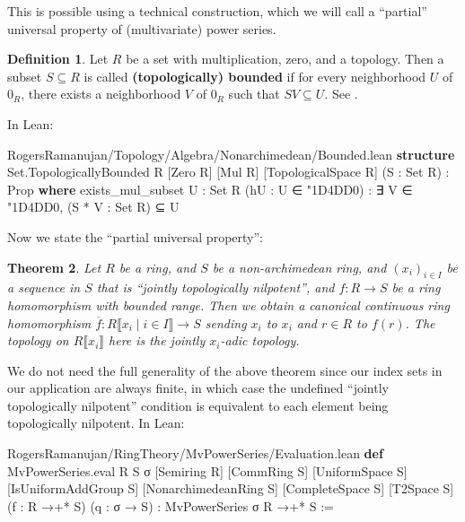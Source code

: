 \documentclass[12pt]{amsart}
\newtheorem{theorem}{Theorem}[subsection]
\theoremstyle{definition}
\newtheorem{definition}[theorem]{Definition}
\theoremstyle{remark}
\numberwithin{equation}{subsection}
\newcommand{\ps}[1]{\llbracket #1 \rrbracket} %
\newcommand{\nhds}{{\char"1D4DD}}
\newcommand{\kw}[1]{\textcolor{keywordcolor}{\textbf{#1}}}
\newcommand{\var}[1]{\textcolor{tacticcolor}{#1}}
\newcommand{\num}[1]{\textcolor{numcolor}{#1}}
\newcommand{\imp}[1]{\textcolor{commentcolor}{\textbraceleft#1\textbraceright}}
\begin{document}
This is possible using a technical construction, which we will call a ``partial'' universal property of (multivariate) power series.


\begin{definition}
    Let $R$ be a set with multiplication, zero, and a topology. Then a subset $S \subseteq R$ is called \textbf{(topologically) bounded} if for every neighborhood $U$ of $0_R$, there exists a neighborhood $V$ of $0_R$ such that $S V \subseteq U$. See \cite[Definition 8.3.8]{GR2004}.
\end{definition}

In Lean:

\begin{code}{RogersRamanujan/Topology/Algebra/Nonarchimedean/Bounded.lean}
\kw{structure} Set.TopologicallyBounded
    \imp{R} [Zero \var{R}] [Mul \var{R}] [TopologicalSpace \var{R}] (\var{S} : Set \var{R}) : Prop \kw{where}
  exists_mul_subset \imp{U : Set R} (\var{hU} : \var{U} ∈ \nhds \num{0}) : ∃ \var{V} ∈ \nhds \num{0}, (\var{S} * \var{V} : Set \var{R}) ⊆ \var{U}
\end{code}

Now we state the ``partial universal property'':
\begin{theorem}
    \label{thm:power-series-eval}
    Let $R$ be a ring, and $S$ be a non-archimedean ring, and $(x_i)_{i \in I}$ be a sequence in $S$ that is ``jointly topologically nilpotent'', and $f: R \to S$ be a ring homomorphism with bounded range. Then we obtain a canonical continuous ring homomorphism $\overline{f}: R\ps{x_i \mid i \in I} \to S$ sending $x_i$ to $x_i$ and $r \in R$ to $f(r)$.
    The topology on $R\ps{x_i}$ here is the jointly $x_i$-adic topology.
\end{theorem}


We do not need the full generality of the above theorem since our index sets in our application are always finite, in which case the undefined ``jointly topologically nilpotent'' condition is equivalent to each element being topologically nilpotent. In Lean:

\begin{code}{RogersRamanujan/RingTheory/MvPowerSeries/Evaluation.lean}
\kw{def} MvPowerSeries.eval \imp{R S σ} [Semiring \var{R}] [CommRing \var{S}] [UniformSpace \var{S}]
  [IsUniformAddGroup \var{S}] [NonarchimedeanRing \var{S}] [CompleteSpace \var{S}] [T2Space \var{S}]
  (\var{f} : \var{R} →+* \var{S}) (\var{q} : \var{σ} → \var{S}) : MvPowerSeries \var{σ} \var{R} →+* \var{S} :=
\end{code}
\end{document}

